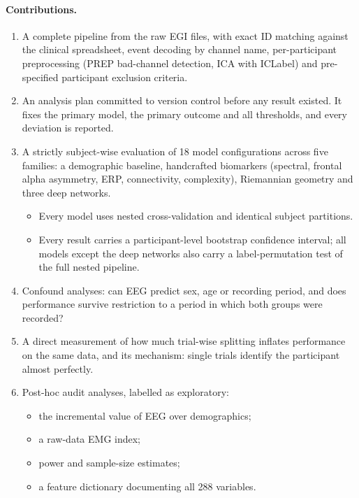 \paragraph{Contributions.}
\begin{enumerate}
  \item A complete pipeline from the raw EGI files, with exact ID matching against the clinical spreadsheet,
        event decoding by channel name, per-participant preprocessing (PREP bad-channel detection, ICA with ICLabel)
        and pre-specified participant exclusion criteria.
  \item An analysis plan committed to version control before any result existed. It fixes the primary model, the
        primary outcome and all thresholds, and every deviation is reported.
  \item A strictly subject-wise evaluation of 18 model configurations across five families: a demographic baseline, handcrafted
        biomarkers (spectral, frontal alpha asymmetry, ERP, connectivity, complexity), Riemannian geometry and three
        deep networks.
        \begin{itemize}
          \item Every model uses nested cross-validation and identical subject partitions.
          \item Every result carries a participant-level bootstrap confidence interval; all models except the
                deep networks also carry a label-permutation test of the full nested pipeline.
        \end{itemize}
  \item Confound analyses: can EEG predict sex, age or recording period, and does performance survive restriction
        to a period in which both groups were recorded?
  \item A direct measurement of how much trial-wise splitting inflates performance on the same data, and its
        mechanism: single trials identify the participant almost perfectly.
  \item Post-hoc audit analyses, labelled as exploratory:
        \begin{itemize}
          \item the incremental value of EEG over demographics;
          \item a raw-data EMG index;
          \item power and sample-size estimates;
          \item a feature dictionary documenting all 288 variables.
        \end{itemize}
\end{enumerate}
